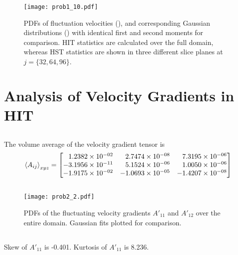 \documentclass[11pt]{article}
\begin{document}
\begin{figure}[t]
\centering
\texttt{[image: prob1\_10.pdf]}
\\[6pt]
\caption{PDFs of fluctuation velocities (), and corresponding Gaussian distributions () with identical first and second moments for comparison. HIT statistics are calculated over the full domain, whereas HST statistics are shown in three different slice planes at $j = \{32,64,96\}$.}
\label{fig:prob_1_10_fluctuation_pdfs}
\end{figure}

\section{Analysis of Velocity Gradients in HIT}

\subsection{}

The volume average of the velocity gradient tensor is
\[
\expectation{A_{ij}}_{xyz} =
\begin{bmatrix*}[r]
 1.2382\e{-02} &  2.7474\e{-08} &  7.3195\e{-06} \\
-3.1956\e{-11} &  5.1524\e{-06} &  1.0050\e{-06} \\
-1.9175\e{-02} & -1.0693\e{-05} & -1.4207\e{-08}
\end{bmatrix*}
\]

\subsection{}

\begin{figure}[t]
\centering
\texttt{[image: prob2\_2.pdf]}
\\[6pt]
\caption{PDFs of the fluctuating velocity gradients $A'_{11}$ and $A'_{12}$ over the entire domain. Gaussian fits plotted for comparison.}
\label{fig:prob_2_2_AijPrime_PDFs}
\end{figure}

\subsection{}

Skew of $A'_{11}$ is -0.401. Kurtosis of $A'_{11}$ is 8.236.

\subsection{}
\end{document}
